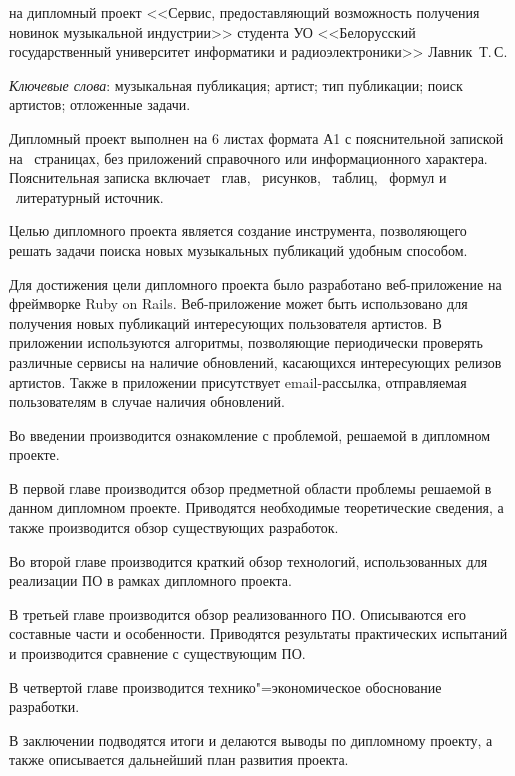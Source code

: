 \thispagestyle{empty}

\begin{center}
  \begin{minipage}{0.82\textwidth}
    на дипломный проект <<Сервис, предоставляющий возможность получения новинок музыкальной индустрии>> студента УО <<Белорусский государственный университет информатики и радиоэлектроники>> Лавник~Т.\,С.
  \end{minipage}
\end{center}

\emph{Ключевые слова}: музыкальная публикация; артист; тип публикации; поиск артистов; отложенные задачи.

\vspace{4\parsep}

Дипломный проект выполнен на 6 листах формата А1 с пояснительной запиской на~\pageref*{LastPage} страницах, без приложений справочного или информационного характера.
Пояснительная записка включает ~глав, \totfig{}~рисунков, \tottab{}~таблиц, \toteq{}~формул и \totref{}~литературный источник.

Целью дипломного проекта является создание инструмента, позволяющего решать задачи поиска новых музыкальных публикаций удобным способом.

Для достижения цели дипломного проекта было разработано веб-приложение на фреймворке Ruby on Rails.
Веб-приложение может быть использовано для получения новых публикаций интересующих пользователя артистов.
В приложении используются алгоритмы, позволяющие периодически проверять различные сервисы на наличие обновлений, касающихся интересующих релизов артистов. Также в приложении присутствует email-рассылка, отправляемая пользователям в случае наличия обновлений.

Во введении производится ознакомление с проблемой, решаемой в дипломном проекте.

В первой главе производится обзор предметной области проблемы решаемой в данном дипломном проекте.
Приводятся необходимые теоретические сведения, а также производится обзор существующих разработок.

Во второй главе производится краткий обзор технологий, использованных для реализации ПО в рамках дипломного проекта.

В третьей главе производится обзор реализованного ПО.
Описываются его составные части и особенности.
Приводятся результаты практических испытаний и производится сравнение с существующим ПО.

В четвертой главе производится технико"=экономическое обоснование разработки.

В заключении подводятся итоги и делаются выводы по дипломному проекту, а также описывается дальнейший план развития проекта.

\clearpage
